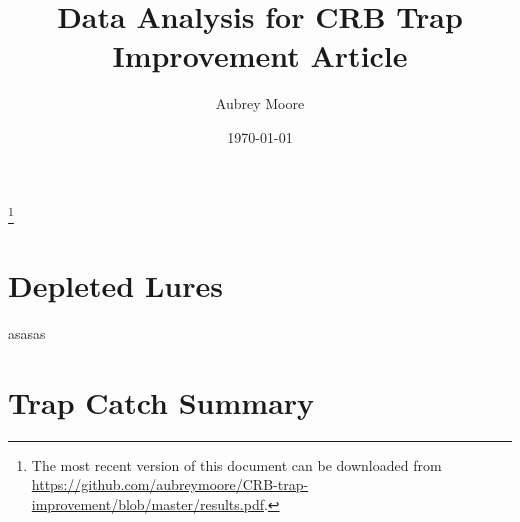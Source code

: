 \documentclass[12pt,letterpaper,english,bibliography=totocnumbered, abstract=on]{scrartcl}
\begin{document}

\title{Data Analysis for CRB Trap Improvement Article}

\author{Aubrey Moore}

\date{\today}


\maketitle

\tableofcontents

\footnote{The most recent version of this document can be downloaded from\\
\url{https://github.com/aubreymoore/CRB-trap-improvement/blob/master/results.pdf}.}

\pagebreak

\section{Depleted Lures}

asasas \cite{moore_research_2012}

\section{Trap Catch Summary}
\end{document}
